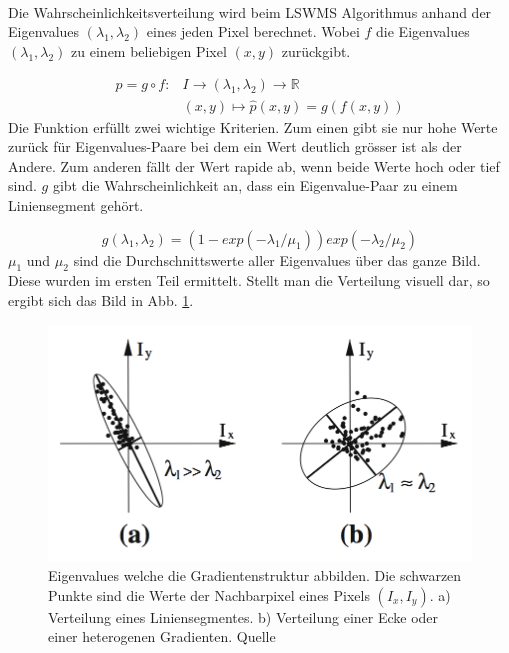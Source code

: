 \paragraph{}
Die Wahrscheinlichkeitsverteilung wird beim LSWMS Algorithmus anhand der Eigenvalues $(\lambda_1, \lambda_2)$ eines jeden Pixel berechnet. Wobei $f$ die Eigenvalues $(\lambda_1, \lambda_2)$ zu einem beliebigen Pixel $(x, y)$ zurückgibt.

\begin{equation}
\begin{split}
p = g \circ f:  &I \to (\lambda_1, \lambda_2) \to \mathbb{R} \\
                &(x, y) \mapsto \hat{p}(x, y) = g(f(x, y))
\end{split}
\end{equation}
\noindent
Die Funktion erfüllt zwei wichtige Kriterien. Zum einen gibt sie nur hohe Werte zurück für Eigenvalues-Paare bei dem ein Wert deutlich grösser ist als der Andere. Zum anderen fällt der Wert rapide ab, wenn beide Werte hoch oder tief sind. $g$ gibt die Wahrscheinlichkeit an, dass ein Eigenvalue-Paar zu einem Liniensegment gehört.

\begin{equation}
g(\lambda_1, \lambda_2) = (1 - exp(-\lambda_1/\mu_1)) exp(-\lambda_2/\mu_2)
\end{equation}
\noindent
$\mu_1$ und $\mu_2$ sind die Durchschnittswerte aller Eigenvalues über das ganze Bild. Diese wurden im ersten Teil ermittelt. Stellt man die Verteilung visuell dar, so ergibt sich das Bild in Abb. \ref{fig:lswms-eigenvalues}.

\begin{figure}[!ht]
\centering
\includegraphics[width=\textwidth]{images/lswms-eigenvalues} 
\caption{Eigenvalues welche die Gradientenstruktur abbilden. Die schwarzen Punkte sind die Werte der Nachbarpixel eines Pixels $(I_x, I_y)$. a) Verteilung eines Liniensegmentes. b) Verteilung einer Ecke oder einer heterogenen Gradienten. Quelle \cite{nieto}}
\label{fig:lswms-eigenvalues}
\end{figure}
\noindent
